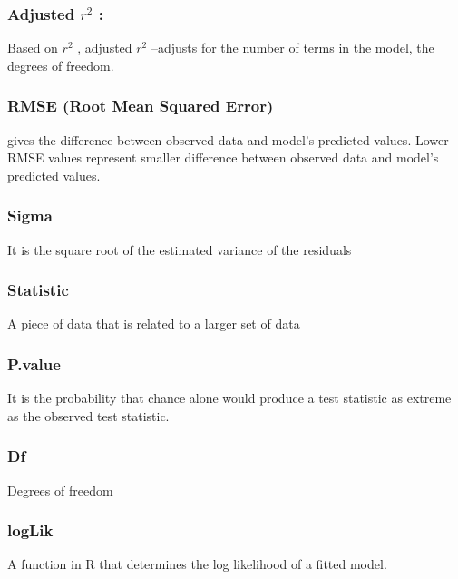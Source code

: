 \documentclass[10pt,letterpaper]{article}
\begin{document}
\subsubsection{\texorpdfstring{Adjusted \(r^2\)
:}{Adjusted r\^{}2 :}}\label{adjusted-r2}

Based on \(r^2\) , adjusted \(r^2\) --adjusts for the number of terms in
the model, the degrees of freedom.

\subsubsection{RMSE (Root Mean Squared
Error)}\label{rmse-root-mean-squared-error}

gives the difference between observed data and model's predicted values.
Lower RMSE values represent smaller difference between observed data and
model's predicted values.

\subsubsection{Sigma}\label{sigma}

It is the square root of the estimated variance of the residuals

\subsubsection{Statistic}\label{statistic}

A piece of data that is related to a larger set of data

\subsubsection{P.value}\label{p.value}

It is the probability that chance alone would produce a test statistic
as extreme as the observed test statistic.

\subsubsection{Df}\label{df}

Degrees of freedom

\subsubsection{logLik}\label{loglik}

A function in R that determines the log likelihood of a fitted model.
\end{document}

